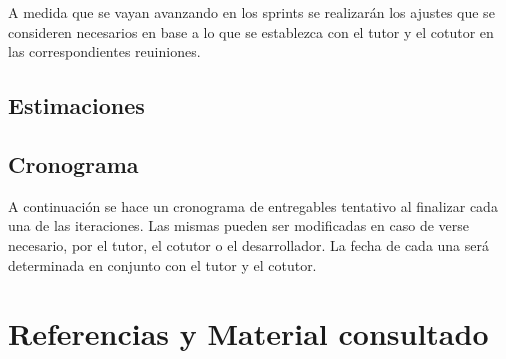 \documentclass[a4paper]{article}
\begin{document}
A medida que se vayan avanzando en los sprints se realizarán los ajustes que se consideren necesarios en base a lo que se establezca con el tutor y el cotutor en las correspondientes reuiniones.

\subsection{Estimaciones}



\subsection{Cronograma}

A continuación se hace un cronograma de entregables tentativo al finalizar cada una de las iteraciones. Las mismas pueden ser modificadas en caso de verse necesario, por el tutor, el cotutor o el desarrollador. La fecha de cada una será determinada en conjunto con el tutor y el cotutor.

\newpage
\section{Referencias y Material consultado}

\renewcommand\refname{\small}
\end{document}
